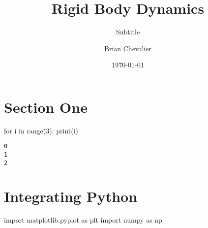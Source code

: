 \documentclass{KDHnotes}
\begin{document}
    
    
    \author{Brian Chevalier}
        \subtitle{Subtitle}
        \title{Rigid Body Dynamics}
        



    \date{\today}
    \maketitle


    
    

    
    \hypertarget{section-one}{%
\section{Section One}\label{section-one}}



\begin{python}
for i in range(3):
    print(i)
\end{python}



    \begin{Verbatim}[commandchars=\\\{\}]
0
1
2

    \end{Verbatim}

    \hypertarget{integrating-python}{%
\section{Integrating Python}\label{integrating-python}}



\begin{python}
import matplotlib.pyplot as plt
import numpy as np
\end{python}





\begin{python}

\end{python}




    
    
    
    
\end{document}
